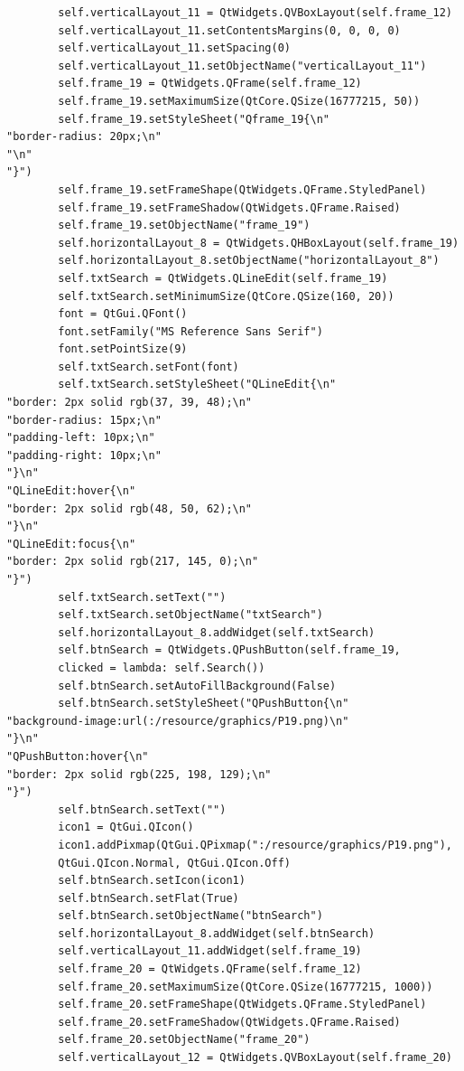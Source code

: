 \documentclass[12pt]{article}
\begin{document}
\begin{verbatim}
        self.verticalLayout_11 = QtWidgets.QVBoxLayout(self.frame_12)
        self.verticalLayout_11.setContentsMargins(0, 0, 0, 0)
        self.verticalLayout_11.setSpacing(0)
        self.verticalLayout_11.setObjectName("verticalLayout_11")
        self.frame_19 = QtWidgets.QFrame(self.frame_12)
        self.frame_19.setMaximumSize(QtCore.QSize(16777215, 50))
        self.frame_19.setStyleSheet("Qframe_19{\n"
"border-radius: 20px;\n"
"\n"
"}")
        self.frame_19.setFrameShape(QtWidgets.QFrame.StyledPanel)
        self.frame_19.setFrameShadow(QtWidgets.QFrame.Raised)
        self.frame_19.setObjectName("frame_19")
        self.horizontalLayout_8 = QtWidgets.QHBoxLayout(self.frame_19)
        self.horizontalLayout_8.setObjectName("horizontalLayout_8")
        self.txtSearch = QtWidgets.QLineEdit(self.frame_19)
        self.txtSearch.setMinimumSize(QtCore.QSize(160, 20))
        font = QtGui.QFont()
        font.setFamily("MS Reference Sans Serif")
        font.setPointSize(9)
        self.txtSearch.setFont(font)
        self.txtSearch.setStyleSheet("QLineEdit{\n"
"border: 2px solid rgb(37, 39, 48);\n"
"border-radius: 15px;\n"
"padding-left: 10px;\n"
"padding-right: 10px;\n"
"}\n"
"QLineEdit:hover{\n"
"border: 2px solid rgb(48, 50, 62);\n"
"}\n"
"QLineEdit:focus{\n"
"border: 2px solid rgb(217, 145, 0);\n"
"}")
        self.txtSearch.setText("")
        self.txtSearch.setObjectName("txtSearch")
        self.horizontalLayout_8.addWidget(self.txtSearch)
        self.btnSearch = QtWidgets.QPushButton(self.frame_19, 
        clicked = lambda: self.Search())
        self.btnSearch.setAutoFillBackground(False)
        self.btnSearch.setStyleSheet("QPushButton{\n"
"background-image:url(:/resource/graphics/P19.png)\n"
"}\n"
"QPushButton:hover{\n"
"border: 2px solid rgb(225, 198, 129);\n"
"}")
        self.btnSearch.setText("")
        icon1 = QtGui.QIcon()
        icon1.addPixmap(QtGui.QPixmap(":/resource/graphics/P19.png"),
        QtGui.QIcon.Normal, QtGui.QIcon.Off)
        self.btnSearch.setIcon(icon1)
        self.btnSearch.setFlat(True)
        self.btnSearch.setObjectName("btnSearch")
        self.horizontalLayout_8.addWidget(self.btnSearch)
        self.verticalLayout_11.addWidget(self.frame_19)
        self.frame_20 = QtWidgets.QFrame(self.frame_12)
        self.frame_20.setMaximumSize(QtCore.QSize(16777215, 1000))
        self.frame_20.setFrameShape(QtWidgets.QFrame.StyledPanel)
        self.frame_20.setFrameShadow(QtWidgets.QFrame.Raised)
        self.frame_20.setObjectName("frame_20")
        self.verticalLayout_12 = QtWidgets.QVBoxLayout(self.frame_20)

\end{verbatim}
\end{document}
